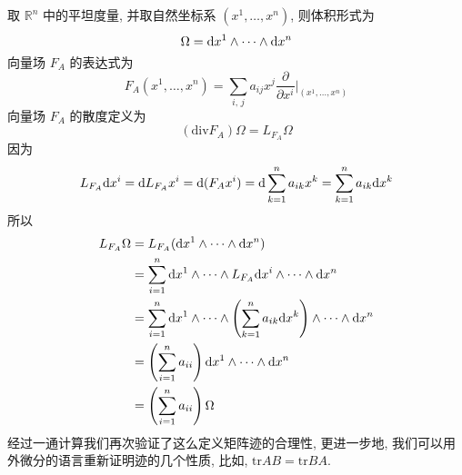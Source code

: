     取 $\mathbb{R}^n$ 中的平坦度量, 并取自然坐标系 $(x^1,\dots,x^n)$, 则体积形式为
    \begin{equation*}
        \Omega = {\rm d} x^1\wedge\cdots\wedge{\rm d} x^n
    \end{equation*}
    向量场 $F_A$ 的表达式为
    \begin{equation*}
        F_A(x^1,\dots,x^n) = \sum_{i,\,j}a_{ij}x^j\frac{\partial}{\partial x^i}\Bigg|_{(x^1,\dots,x^n)}
    \end{equation*}
    向量场 $F_A$ 的散度定义为
    \begin{equation}\label{div}
        (\mathrm{div}F_A)\Omega = L_{F_A}\Omega
    \end{equation}
    因为
    \begin{equation*}
        L_{F_A}{\rm d} x^i = {\rm d} L_{F_A}x^i
        = {\rm d} (F_Ax^i)
        = {\rm d} \sum_{k=1}^{n}a_{ik}x^k
        = \sum_{k=1}^{n}a_{ik}{\rm d} x^k
    \end{equation*}
    所以
    \begin{align*}
        L_{F_A}\Omega &= L_{F_A}({\rm d} x^1\wedge\cdots\wedge{\rm d} x^n) \\
        &= \sum_{i=1}^{n}{\rm d} x^1\wedge\cdots\wedge L_{F_A}{\rm d} x^i \wedge\cdots\wedge{\rm d} x^n \\
        &= \sum_{i=1}^{n}{\rm d} x^1\wedge\cdots\wedge\left(\sum_{k=1}^{n}a_{ik}{\rm d} x^k\right)\wedge\cdots\wedge{\rm d} x^n \\
        &= \left(\sum_{i=1}^{n}a_{ii}\right){\rm d} x^1\wedge\cdots\wedge{\rm d} x^n \\
        &= \left(\sum_{i=1}^{n}a_{ii}\right)\Omega
    \end{align*}
    经过一通计算我们再次验证了这么定义矩阵迹的合理性, 更进一步地, 我们可以用外微分的语言重新证明迹的几个性质, 比如, $\mathrm{tr}AB = \mathrm{tr}BA$.
    
